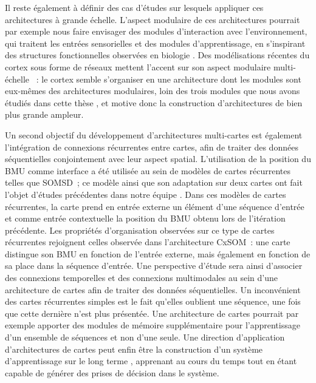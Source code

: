 Il reste également à définir des cas d'études sur lesquels appliquer ces architectures à grande échelle.
L'aspect modulaire de ces architectures pourrait par exemple nous faire envisager des modules d'interaction avec l'environnement, qui traitent les entrées sensorielles et des modules d'apprentissage, en s'inspirant des structures fonctionnelles observées en biologie \parencite{Ellefsen2015NeuralMH}. 
Des modélisations récentes du cortex sous forme de réseaux mettent l'accent sur son aspect modulaire multi-échelle \parencite{betzel_multi-scale_2017}~: le cortex semble s'organiser en une architecture dont les modules sont eux-mêmes des architectures modulaires, loin des trois modules que nous avons étudiés dans cette thèse , et motive donc la construction d'architectures de bien plus grande ampleur.

Un second objectif du développement d'architectures multi-cartes est également l'intégration de connexions récurrentes entre cartes, afin de traiter des données séquentielles conjointement avec leur aspect spatial. 
L'utilisation de la position du BMU comme interface a été utilisée au sein de modèles de cartes récurrentes telles que SOMSD~; ce modèle ainsi que son adaptation sur deux cartes ont fait l'objet d'études précédentes dans notre équipe \parencite{baheux_towards_2014, fix20}. 
Dans ces modèles de cartes récurrentes, la carte prend en entrée externe un élément d'une séquence d'entrée et comme entrée contextuelle la position du BMU obtenu lors de l'itération précédente.
Les propriétés d'organisation observées sur ce type de cartes récurrentes rejoignent celles observée dans l'architecture CxSOM~: une carte distingue son BMU en fonction de l'entrée externe, mais également en fonction de sa place dans la séquence d'entrée.
Une perspective d'étude sera ainsi d'associer des connexions temporelles et des connexions multimodales au sein d'une architecture de cartes afin de traiter des données séquentielles.
Un inconvénient des cartes récurrentes simples est le fait qu'elles oublient une séquence, une fois que cette dernière n'est plus présentée. 
Une architecture de cartes pourrait par exemple apporter des modules de mémoire supplémentaire pour l'apprentissage d'un ensemble de séquences et non d'une seule.
Une direction d'application d'architectures de cartes peut enfin être la construction d'un système d'apprentissage \og sur le long terme \fg{}, apprenant au cours du temps tout en étant capable de générer des prises de décision dans le système.






